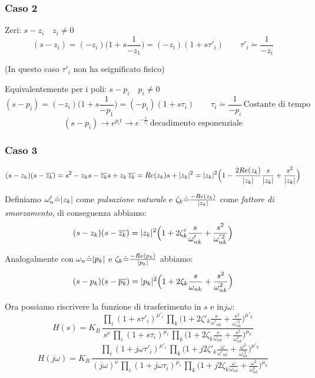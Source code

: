 \subsubsection{Caso 2}
Zeri: $ s-z_i \quad z_i \ne 0 $
\[ 
	(s-z_i)=(-z_i)\Big(1+s \frac{1}{-z_1} \Big)=(-z_i)(1+s \tau'_i) \qquad \tau'_i \dot{=} \frac{1}{-z_i}
 \]
 
 (In questo caso $ \tau'_i $ non ha seignificato fisico) %
 
 Equivalentemente per i poli: $ s-p_i \quad p_i \ne 0 $
 \[ 
 (s-p_i)=(-z_i)\Big(1+s \frac{1}{-p_1} \Big)=(-p_i)(1+s \tau_i) \qquad \tau_i \dot{=} \frac{1}{-p_i} \, \text{Costante di tempo}
 \]
 \[ (s-p_i) \rightarrow e^{p_i t} \rightarrow e^{-\frac{t}{\tau_1}} \, \text{decadimento esponenziale}\]
 
 \subsubsection{Caso 3}
 
 \[ 
 	(s-z_k)(s-\overline{z_k}) = s^2-z_ks-\overline{z_k}s+z_k \,\overline{z_k} = Re(z_k) s+\lvert z_k\rvert^2 = \lvert z_k\rvert^2\Big(1-\frac{2 Re(z_k)}{\lvert z_k\rvert}\frac{s}{\lvert z_k\rvert}+\frac{s^2}{\lvert z_k\rvert} \Big)
 \]

 Definiamo $ \omega'_n \dot{=} \lvert z_k\rvert $ come \emph{pulsazione naturale} e $ \zeta_k \dot{=} \frac{-Re(z_k)}{\lvert z_k\rvert} $ come \emph{fattore di smorzamento}, di conseguenza abbiamo: 
 \[ 
 	(s-z_k)(s-\overline{z_k}) = \lvert z_k\rvert^2\Big(1+2\zeta'_k\frac{s}{\omega'_{nk}}+\frac{s^2}{\omega^{'2}_{nk}} \Big)
  \]
  
  Analogalmente con $ \omega_n \dot{=} \lvert p_k\rvert $ e $ \zeta_k \dot{=} \frac{-Re(p_k)}{\lvert p_k\rvert} $ abbiamo:
   \[ 
  (s-p_k)(s-\overline{p_k}) = \lvert p_k\rvert^2\Big(1+2\zeta_k\frac{s}{\omega_{nk}}+\frac{s^2}{\omega^{2}_{nk}} \Big)
  \]
  
  Ora possiamo riscrivere la funzione di trasferimento in $ s $ e in$ j\omega $:
  \[ 
  	H(s) = K_B \, \frac{\prod_i (1+s\tau'_i)^{\mu'_i}\,  \prod_k \Big(1+2\zeta'_k\frac{s}{\omega'_{nk}}+\frac{s^2}{\omega^{'2}_{nk}} \Big)^{\mu'_k}}{s^\nu\, \prod_i (1+s\tau_i)^{\mu_i}\,  \prod_k \Big(1+2\zeta_k\frac{s}{\omega_{nk}}+\frac{s^2}{\omega^{2}_{nk}} \Big)^{\mu_k} }
   \]
     \[ 
   H(j\omega) = K_B \, \frac{\prod_i (1+j\omega\tau'_i)^{\mu'_i}\,  \prod_k \Big(1+j2\zeta'_k\frac{\omega}{\omega'_{nk}}+\frac{\omega^2}{\omega^{'2}_{nk}} \Big)^{\mu'_k}}{(j\omega)^\nu\, \prod_i (1+j\omega\tau_i)^{\mu_i}\,  \prod_k \Big(1+j2\zeta_k\frac{\omega}{\omega_{nk}}+\frac{\omega^2}{\omega^{2}_{nk}} \Big)^{\mu_k} }
   \]
  
